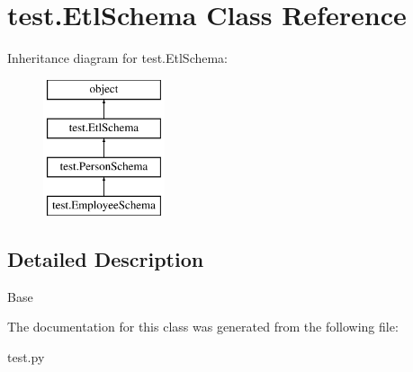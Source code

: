 \hypertarget{classtest_1_1EtlSchema}{\section{test.\-Etl\-Schema Class Reference}
\label{classtest_1_1EtlSchema}
}
Inheritance diagram for test.\-Etl\-Schema\-:\begin{figure}[H]
\begin{center}
\leavevmode
\includegraphics[height=4.000000cm]{classtest_1_1EtlSchema}
\end{center}
\end{figure}


\subsection{Detailed Description}
\begin{DoxyVerb}Base\end{DoxyVerb}
 

The documentation for this class was generated from the following file\-:\begin{DoxyCompactItemize}
\item 
test.\-py\end{DoxyCompactItemize}
